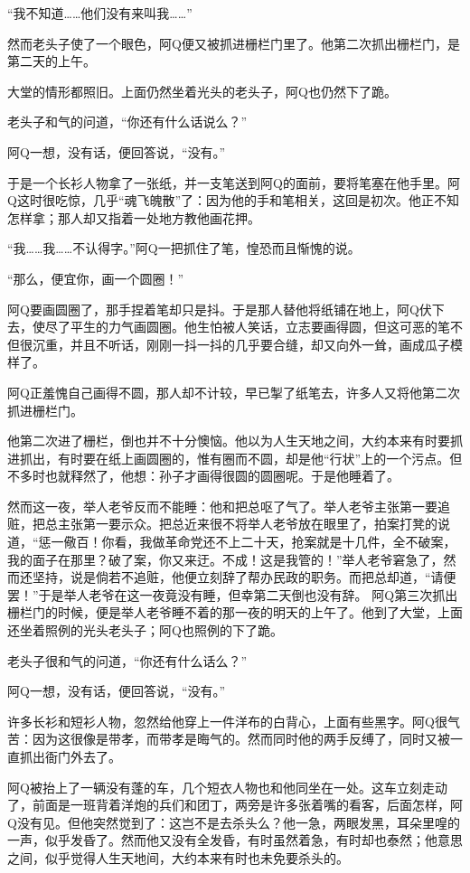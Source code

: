 \documentclass[12pt,UTF8]{ctexbook}
\begin{document}
“我不知道……他们没有来叫我……”

然而老头子使了一个眼色，阿Q便又被抓进栅栏门里了。他第二次抓出栅栏门，是第二天的上午。

大堂的情形都照旧。上面仍然坐着光头的老头子，阿Q也仍然下了跪。

老头子和气的问道，“你还有什么话说么？”

阿Q一想，没有话，便回答说，“没有。”

于是一个长衫人物拿了一张纸，并一支笔送到阿Q的面前，要将笔塞在他手里。阿Q这时很吃惊，几乎“魂飞魄散”了：因为他的手和笔相关，这回是初次。他正不知怎样拿；那人却又指着一处地方教他画花押。

“我……我……不认得字。”阿Q一把抓住了笔，惶恐而且惭愧的说。

“那么，便宜你，画一个圆圈！”

阿Q要画圆圈了，那手捏着笔却只是抖。于是那人替他将纸铺在地上，阿Q伏下去，使尽了平生的力气画圆圈。他生怕被人笑话，立志要画得圆，但这可恶的笔不但很沉重，并且不听话，刚刚一抖一抖的几乎要合缝，却又向外一耸，画成瓜子模样了。

阿Q正羞愧自己画得不圆，那人却不计较，早已掣了纸笔去，许多人又将他第二次抓进栅栏门。

他第二次进了栅栏，倒也并不十分懊恼。他以为人生天地之间，大约本来有时要抓进抓出，有时要在纸上画圆圈的，惟有圈而不圆，却是他“行状”上的一个污点。但不多时也就释然了，他想：孙子才画得很圆的圆圈呢。于是他睡着了。

然而这一夜，举人老爷反而不能睡：他和把总呕了气了。举人老爷主张第一要追赃，把总主张第一要示众。把总近来很不将举人老爷放在眼里了，拍案打凳的说道，“惩一儆百！你看，我做革命党还不上二十天，抢案就是十几件，全不破案，我的面子在那里？破了案，你又来迂。不成！这是我管的！”举人老爷窘急了，然而还坚持，说是倘若不追赃，他便立刻辞了帮办民政的职务。而把总却道，“请便罢！”于是举人老爷在这一夜竟没有睡，但幸第二天倒也没有辞。
阿Q第三次抓出栅栏门的时候，便是举人老爷睡不着的那一夜的明天的上午了。他到了大堂，上面还坐着照例的光头老头子；阿Q也照例的下了跪。

老头子很和气的问道，“你还有什么话么？”

阿Q一想，没有话，便回答说，“没有。”

许多长衫和短衫人物，忽然给他穿上一件洋布的白背心，上面有些黑字。阿Q很气苦：因为这很像是带孝，而带孝是晦气的。然而同时他的两手反缚了，同时又被一直抓出衙门外去了。

阿Q被抬上了一辆没有蓬的车，几个短衣人物也和他同坐在一处。这车立刻走动了，前面是一班背着洋炮的兵们和团丁，两旁是许多张着嘴的看客，后面怎样，阿Q没有见。但他突然觉到了：这岂不是去杀头么？他一急，两眼发黑，耳朵里喤的一声，似乎发昏了。然而他又没有全发昏，有时虽然着急，有时却也泰然；他意思之间，似乎觉得人生天地间，大约本来有时也未免要杀头的。
\end{document}
